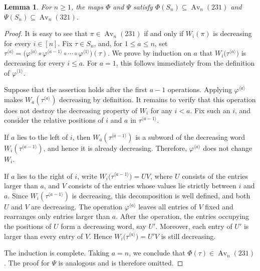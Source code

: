 \documentclass[11pt]{article}
\newtheorem{lem}[thm]{Lemma}
\begin{document}
\begin{lem}\label{lem:images-of-Phi-Psi}
For $n\geq 1$, the maps $\Phi$ and $\Psi$ satisfy
$\Phi(S_n)\subseteq \operatorname{Av}_n(231)$ and $\Psi(S_n)\subseteq \operatorname{Av}_n(321)$.
\end{lem}

\begin{proof}
It is easy to see that $\pi\in\operatorname{Av}_n(231)$ if and only if $W_i(\pi)$ is
decreasing for every $i\in[n]$.
Fix $\tau\in S_n$, and, for $1\leq a\leq n$, set
$\tau^{\langle a\rangle}
=
\bigl(
\varphi^{\langle a\rangle}\circ
\varphi^{\langle a-1\rangle}\circ\cdots\circ
\varphi^{\langle 1\rangle}
\bigr)(\tau)$.
We prove by induction on $a$ that
$W_i\bigl(\tau^{\langle a\rangle}\bigr)$ is decreasing for every $i\leq a$.
For $a=1$, this follows immediately from the definition of
$\varphi^{\langle1\rangle}$.

Suppose that the assertion holds after the first $a-1$ operations.
Applying $\varphi^{\langle a\rangle}$ makes
$W_a(\tau^{\langle a\rangle})$ decreasing by definition. It remains
to verify that this operation does not destroy the decreasing property
of $W_i$ for any $i<a$. Fix such an $i$, and consider the relative
positions of $i$ and $a$ in $\tau^{\langle a-1\rangle}$.

If $a$ lies to the left of $i$, then $W_a(\tau^{\langle a-1\rangle})$ is a subword of the
decreasing word $W_i(\tau^{\langle a-1\rangle})$, and hence it is
already decreasing. Therefore, $\varphi^{\langle a\rangle}$ does not
change $W_i$.

If $a$ lies to the right of $i$, write $W_i\bigl(\tau^{\langle a-1\rangle}\bigr)=UV$,
where $U$ consists of the entries larger than $a$, and $V$ consists
of the entries whose values lie strictly between $i$ and $a$.
Since $W_i(\tau^{\langle a-1\rangle})$ is decreasing, this
decomposition is well defined, and both $U$ and $V$ are decreasing.
The operation $\varphi^{\langle a\rangle}$ leaves all entries of $V$
fixed and rearranges only entries larger than $a$. After the operation,
the entries occupying the positions of $U$ form a decreasing word,
say $U'$. Moreover, each entry of $U'$ is larger than every entry of $V$. Hence
$W_i\bigl(\tau^{\langle a\rangle}\bigr)=U'V$
is still decreasing.

The induction is complete. Taking $a=n$, we conclude that
$\Phi(\tau)\in\operatorname{Av}_n(231)$.
The proof for $\Psi$ is analogous and is therefore omitted.
\end{proof}
\end{document}
